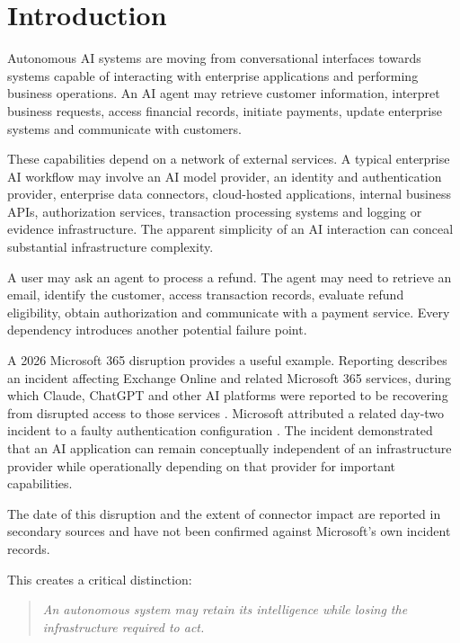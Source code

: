 \documentclass[11pt,a4paper]{article}
\begin{document}
\tableofcontents
\newpage

\section{Introduction}

Autonomous AI systems are moving from conversational interfaces towards systems capable of interacting with enterprise applications and performing business operations. An AI agent may retrieve customer information, interpret business requests, access financial records, initiate payments, update enterprise systems and communicate with customers.

These capabilities depend on a network of external services. A typical enterprise AI workflow may involve an AI model provider, an identity and authentication provider, enterprise data connectors, cloud-hosted applications, internal business APIs, authorization services, transaction processing systems and logging or evidence infrastructure. The apparent simplicity of an AI interaction can conceal substantial infrastructure complexity.

A user may ask an agent to process a refund. The agent may need to retrieve an email, identify the customer, access transaction records, evaluate refund eligibility, obtain authorization and communicate with a payment service. Every dependency introduces another potential failure point.

A 2026 Microsoft 365 disruption provides a useful example. Reporting describes an incident affecting Exchange Online and related Microsoft 365 services, during which Claude, ChatGPT and other AI platforms were reported to be recovering from disrupted access to those services \cite{tribune}. Microsoft attributed a related day-two incident to a faulty authentication configuration \cite{itpro}. The incident demonstrated that an AI application can remain conceptually independent of an infrastructure provider while operationally depending on that provider for important capabilities.

The date of this disruption and the extent of connector impact are reported in secondary sources and have not been confirmed against Microsoft's own incident records.

This creates a critical distinction:
\begin{quote}
\emph{An autonomous system may retain its intelligence while losing the infrastructure required to act.}
\end{quote}
\end{document}
